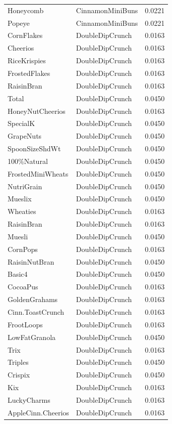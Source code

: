 \begin{longtable}{llr}
Honeycomb & CinnamonMiniBuns & 0.0221 \\
Popeye & CinnamonMiniBuns & 0.0221 \\
CornFlakes & DoubleDipCrunch & 0.0163 \\
Cheerios & DoubleDipCrunch & 0.0163 \\
RiceKrispies & DoubleDipCrunch & 0.0163 \\
FrostedFlakes & DoubleDipCrunch & 0.0163 \\
RaisinBran & DoubleDipCrunch & 0.0163 \\
Total & DoubleDipCrunch & 0.0450 \\
HoneyNutCheerios & DoubleDipCrunch & 0.0163 \\
SpecialK & DoubleDipCrunch & 0.0450 \\
GrapeNuts & DoubleDipCrunch & 0.0450 \\
SpoonSizeShdWt & DoubleDipCrunch & 0.0450 \\
100\%Natural & DoubleDipCrunch & 0.0450 \\
FrostedMiniWheats & DoubleDipCrunch & 0.0450 \\
NutriGrain & DoubleDipCrunch & 0.0450 \\
Mueslix & DoubleDipCrunch & 0.0450 \\
Wheaties & DoubleDipCrunch & 0.0163 \\
RaisinBran & DoubleDipCrunch & 0.0163 \\
Muesli & DoubleDipCrunch & 0.0450 \\
CornPops & DoubleDipCrunch & 0.0163 \\
RaisinNutBran & DoubleDipCrunch & 0.0450 \\
Basic4 & DoubleDipCrunch & 0.0450 \\
CocoaPus & DoubleDipCrunch & 0.0163 \\
GoldenGrahams & DoubleDipCrunch & 0.0163 \\
Cinn.ToastCrunch & DoubleDipCrunch & 0.0163 \\
FrootLoops & DoubleDipCrunch & 0.0163 \\
LowFatGranola & DoubleDipCrunch & 0.0450 \\
Trix & DoubleDipCrunch & 0.0163 \\
Triples & DoubleDipCrunch & 0.0450 \\
Crispix & DoubleDipCrunch & 0.0450 \\
Kix & DoubleDipCrunch & 0.0163 \\
LuckyCharms & DoubleDipCrunch & 0.0163 \\
AppleCinn.Cheerios & DoubleDipCrunch & 0.0163 \\

\end{longtable}
